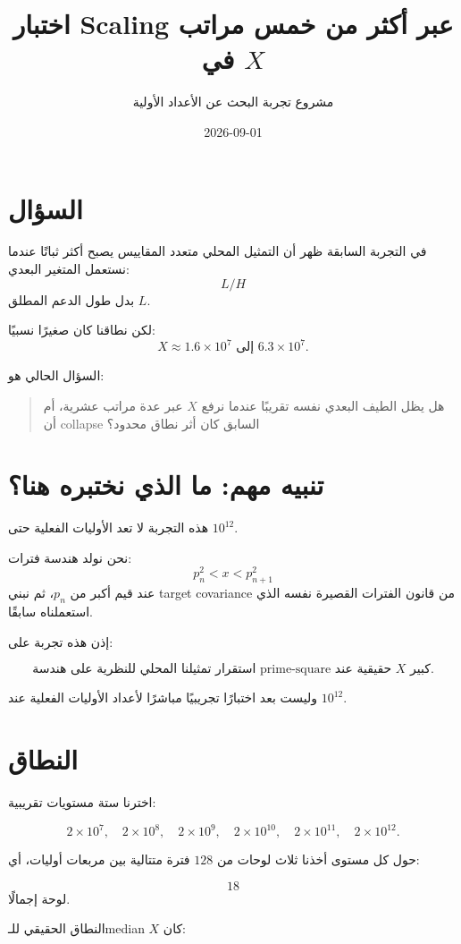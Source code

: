 \documentclass[12pt]{article}
\title{اختبار Scaling عبر أكثر من خمس مراتب في \(X\)}
\author{مشروع تجربة البحث عن الأعداد الأولية}
\date{2026-09-01}
\begin{document}
\maketitle

\section{السؤال}

في التجربة السابقة ظهر أن التمثيل المحلي متعدد المقاييس يصبح أكثر ثباتًا
عندما نستعمل المتغير البعدي:
\[
L/H
\]
بدل طول الدعم المطلق \(L\).

لكن نطاقنا كان صغيرًا نسبيًا:
\[
X\approx1.6\times10^7
\text{ إلى }
6.3\times10^7.
\]

السؤال الحالي هو:

\begin{quote}
هل يظل الطيف البعدي نفسه تقريبًا عندما نرفع \(X\) عبر عدة مراتب عشرية،
أم أن collapse السابق كان أثر نطاق محدود؟
\end{quote}

\section{تنبيه مهم: ما الذي نختبره هنا؟}

هذه التجربة لا تعد الأوليات الفعلية حتى \(10^{12}\).

نحن نولد هندسة فترات:
\[
p_n^2<x<p_{n+1}^2
\]
عند قيم أكبر من \(p_n\)، ثم نبني target covariance من قانون الفترات القصيرة
نفسه الذي استعملناه سابقًا.

إذن هذه تجربة على:

\[
\boxed{
\text{استقرار تمثيلنا المحلي للنظرية على هندسة prime-square حقيقية عند }X\text{ كبير.}
}
\]

وليست بعد اختبارًا تجريبيًا مباشرًا لأعداد الأوليات الفعلية عند \(10^{12}\).

\section{النطاق}

اخترنا ستة مستويات تقريبية:

\[
2\times10^7,\quad
2\times10^8,\quad
2\times10^9,\quad
2\times10^{10},\quad
2\times10^{11},\quad
2\times10^{12}.
\]

حول كل مستوى أخذنا ثلاث لوحات من \(128\) فترة متتالية بين مربعات أوليات،
أي:

\[
18
\]
لوحة إجمالًا.

النطاق الحقيقي للـmedian \(X\) كان:
\end{document}
